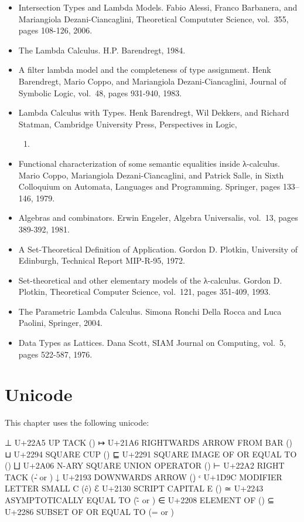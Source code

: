 \begin{itemize}
\item
  Intersection Types and Lambda Models. Fabio Alessi, Franco Barbanera,
  and Mariangiola Dezani-Ciancaglini, Theoretical Compututer Science,
  vol.~355, pages 108-126, 2006.
\item
  The Lambda Calculus. H.P. Barendregt, 1984.
\item
  A filter lambda model and the completeness of type assignment. Henk
  Barendregt, Mario Coppo, and Mariangiola Dezani-Ciancaglini, Journal
  of Symbolic Logic, vol.~48, pages 931-940, 1983.
\item
  Lambda Calculus with Types. Henk Barendregt, Wil Dekkers, and Richard
  Statman, Cambridge University Press, Perspectives in Logic,

  \begin{enumerate}
  \def\labelenumi{\arabic{enumi}.}
  \setcounter{enumi}{2012}
  \tightlist
  \item
  \end{enumerate}
\item
  Functional characterization of some semantic equalities inside
  λ-calculus. Mario Coppo, Mariangiola Dezani-Ciancaglini, and Patrick
  Salle, in Sixth Colloquium on Automata, Languages and Programming.
  Springer, pages 133--146, 1979.
\item
  Algebras and combinators. Erwin Engeler, Algebra Universalis, vol.~13,
  pages 389-392, 1981.
\item
  A Set-Theoretical Definition of Application. Gordon D. Plotkin,
  University of Edinburgh, Technical Report MIP-R-95, 1972.
\item
  Set-theoretical and other elementary models of the λ-calculus. Gordon
  D. Plotkin, Theoretical Computer Science, vol.~121, pages 351-409,
  1993.
\item
  The Parametric Lambda Calculus. Simona Ronchi Della Rocca and Luca
  Paolini, Springer, 2004.
\item
  Data Types as Lattices. Dana Scott, SIAM Journal on Computing, vol.~5,
  pages 522-587, 1976.
\end{itemize}

\hypertarget{unicode}{%
\section{Unicode}\label{unicode}}

This chapter uses the following unicode:

\begin{myDisplay}
⊥  U+22A5  UP TACK (\bot)
↦  U+21A6  RIGHTWARDS ARROW FROM BAR (\mapsto)
⊔  U+2294  SQUARE CUP (\lub)
⊑  U+2291  SQUARE IMAGE OF OR EQUAL TO (\sqsubseteq)
⨆ U+2A06  N-ARY SQUARE UNION OPERATOR (\Lub)
⊢  U+22A2  RIGHT TACK (\|- or \vdash)
↓  U+2193  DOWNWARDS ARROW (\d)
ᶜ  U+1D9C  MODIFIER LETTER SMALL C (\^c)
ℰ  U+2130  SCRIPT CAPITAL E (\McE)
≃  U+2243  ASYMPTOTICALLY EQUAL TO (\~- or \simeq)
∈  U+2208  ELEMENT OF (\in)
⊆  U+2286  SUBSET OF OR EQUAL TO (\sub= or \subseteq)
\end{myDisplay}


